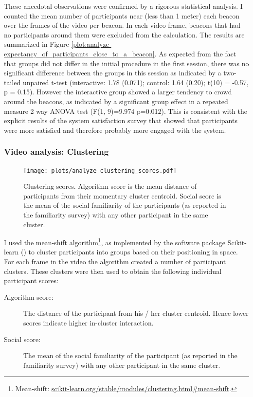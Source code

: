 \documentclass[a4paper,11pt]{article}
\begin{document}
{These anecdotal observations were confirmed by a rigorous statistical analysis.
I counted the mean number of participants near (less than 1 meter) each beacon over the frames of the video per beacon.
In each video frame, beacons that had no participants around them were excluded from the calculation.
The results are summarized in Figure \ref{plot:analyze-expectancy_of_participants_close_to_a_beacon}.
As expected from the fact that groups did not differ in the initial procedure in the first session, there was no significant difference between the groups in this session as indicated by a two-tailed unpaired t-test (interactive: 1.78 (0.071); control: 1.64 (0.20); t(10) = -0.57, p = 0.15).
However the interactive group showed a larger tendency to crowd around the beacons, as indicated by a significant group effect in a repeated measure 2 way ANOVA test (F(1, 9)=9.974 p=0.012).
This is consistent with the explicit results of the system satisfaction survey that showed that participants were more satisfied and therefore probably more engaged with the system.

\subsubsection{Video analysis: Clustering}\label{results:clustering}

\begin{figure}[!htb]
    \centering
    \texttt{[image: plots/analyze-clustering\_scores.pdf]}
    \caption{Clustering scores. Algorithm score is the mean distance of participants from their momentary cluster centroid. Social score is the mean of the social familiarity of the participants (as reported in the familiarity survey) with any other participant in the same cluster.}\label{plot:analyze-clustering_scores}
\end{figure}

I used the mean-shift algorithm\footnote{Mean-shift: \href{http://scikit-learn.org/stable/modules/clustering.html\#mean-shift}{scikit-learn.org/stable/modules/clustering.html\#mean-shift}.}, as implemented by the software package Scikit-learn (\cite{scikit-learn}) to cluster participants into groups based on their positioning in space.
For each frame in the video the algorithm created a number of participant clusters.
These clusters were then used to obtain the following individual participant scores:

\begin{description}
    \item[Algorithm score:] The distance of the participant from his / her cluster centroid.
        Hence lower scores indicate higher in-cluster interaction. \label{results:algorithm_score}
    \item[Social score:] The mean of the social familiarity of the participant (as reported in the familiarity survey) with any other participant in the same cluster. \label{results:social_score}
\end{description}

}
\end{document}
